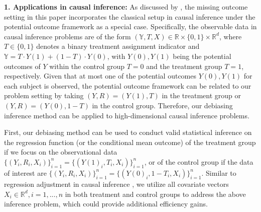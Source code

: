 \documentclass[ejsv2,noshowframe]{imsart}
\theoremstyle{plain}
\theoremstyle{definition}
\theoremstyle{remark}
\begin{document}
{\bf 1. Applications in causal inference:} As discussed by \cite{ding2018causal,chakrabortty2019high}, the missing outcome setting in this paper incorporates the classical setup in causal inference under the potential outcome framework \citep{rubin1974estimating} as a special case. Specifically, the observable data in causal inference problems are of the form $\left(\mathbb{Y},T,X \right) \in \mathbb{R}\times \{0,1\}\times \mathbb{R}^d$, where $T\in \{0,1\}$ denotes a binary treatment assignment indicator and $\mathbb{Y}= T\cdot Y(1) + (1-T)\cdot Y(0)$, with $Y(0),Y(1)$ being the potential outcomes of $Y$ within the control group $T=0$ and the treatment group $T=1$, respectively. Given that at most one of the potential outcomes $Y(0),Y(1)$ for each subject is observed, the potential outcome framework can be related to our problem setting by taking $(Y,R)=(Y(1), T)$ in the treatment group or $(Y,R)=(Y(0),1-T)$ in the control group. Therefore, our debiasing inference method can be applied to high-dimensional causal inference problems.

First, our debiasing method can be used to conduct valid statistical inference on the regression function (or the conditional mean outcome) of the treatment group if we focus on the observational data $\{(Y_i, R_i,X_i)\}_{i=1}^n = \{(Y(1)_i, T_i,X_i)\}_{i=1}^n$, or of the control group if the data of interest are $\{(Y_i, R_i,X_i)\}_{i=1}^n = \{(Y(0)_i, 1-T_i,X_i)\}_{i=1}^n$. Similar to regression adjustment in causal inference \citep{freedman2008regression,lin2013agnostic,negi2021revisiting}, we utilize all covariate vectors $X_i\in \mathbb{R}^d,i=1,...,n$ in both treatment and control groups to address the above inference problem, which could provide additional efficiency gains.
\end{document}
